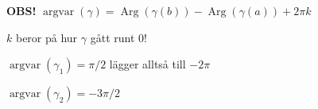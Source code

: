 \textcolor{red!70!black}{\textbf{OBS!}} $\operatorname{argvar}(\gamma) = \operatorname{Arg}(\gamma(b)) - \operatorname{Arg}(\gamma(a)) + 2\pi k$

$k$ beror på hur $\gamma$ gått runt $0$\textcolor{red!70!black}{!}

\begin{example}
$\operatorname{argvar}(\gamma_1) = \pi/2$ \qquad \textcolor{magenta!80!black}{lägger alltså till $-2\pi$}

$\operatorname{argvar}(\gamma_2) = -3\pi/2$
\end{example}
